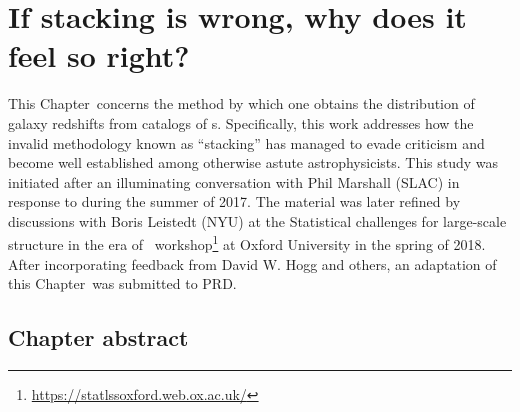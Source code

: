 \renewcommand{\chapid}{pedant}
\renewcommand{\paper}{Chapter}
\newcommand{\dwh}[1]{{#1}}


\chapter{ If stacking is wrong, why does it feel so right?  }

This \paper\ concerns the method by which one obtains the distribution of galaxy redshifts from catalogs of \pzpdf s.
Specifically, this work addresses how the invalid methodology known as ``stacking'' has managed to evade criticism and become well established among otherwise astute astrophysicists.
This study was initiated after an illuminating conversation with Phil Marshall (SLAC) in response to \citet{gruen_combining_2017} during the summer of 2017.
The material was later refined by discussions with Boris Leistedt (NYU) at the Statistical challenges for large-scale structure in the era of \lsst\ workshop\footnote{\url{https://statlssoxford.web.ox.ac.uk/}} at Oxford University in the spring of 2018.
After incorporating feedback from David W. Hogg and others, an adaptation of this \paper\ was submitted to PRD.

\section*{Chapter abstract}

